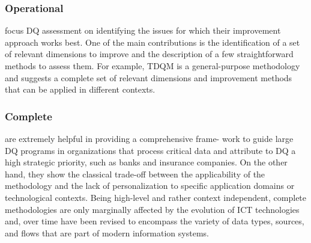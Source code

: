 \documentclass[pdftex,english,oribibl]{llncs}
\begin{document}
\begin{comment}
From a historical perspective, there exists a correlation between quality dimensions and the evolution of ICT technologies.
The evolution of information systems from monolithic to network-based has caused a growth of the number of data sources in both size and scope and, consequently has significantly increased the complexity of data quality management. DQ methodologies have started to focus on new quality dimensions, such as the completeness of the data source, the currency of data, and the consistency of the new data sources compared to the enterprise database. With the advent of the Web, data sources have become difficult to assess and control over time. At the same time, searching and navigating through the Web is potentially unlimited. As a consequence of this fast evolution, methodologies have started to address new quality dimensions, such as accessibility and reputation. Accessibility measures the ability of users to access data, given their culture, physical status and available technologies, and is important in cooperative and network-based information systems. Reputation (or trustworthiness) is a property of data sources measuring
\end{comment}
\subsubsection{Operational} focus DQ assessment on identifying the issues for which their improvement approach works best. One of the main contributions is the identification of a set of relevant dimensions to improve and the description of a few straightforward methods to assess them. For example, TDQM is a general-purpose methodology and suggests a complete set of relevant dimensions and improvement methods that can be applied in different contexts.
\subsubsection{Complete} are extremely helpful in providing a comprehensive frame- work to guide large DQ programs in organizations that process critical data and attribute to DQ a high strategic priority, such as banks and insurance companies. On the other hand, they show the classical trade-off between the applicability of the methodology and the lack of personalization to specific application domains or technological contexts. Being high-level and rather context independent, complete methodologies are only marginally affected by the evolution of ICT technologies and, over time have been revised to encompass the variety of data types, sources, and flows that are part of modern information systems.
\end{document}
